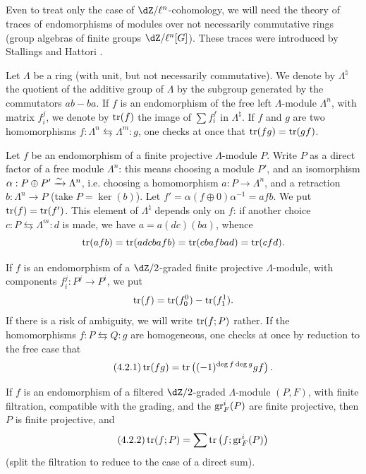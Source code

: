 \subsection{}\label{II:4-2}

Even to treat only the case of $\dZ/\ell^n$-cohomology, we will
need the theory of traces of endomorphisms of modules over
not necessarily commutative rings (group algebras of finite groups
$\dZ/\ell^n[G]$). These traces were introduced by Stallings and Hattori
\cite{ba76}.

Let $\Lambda$ be a ring (with unit, but not necessarily commutative).
We denote by $\Lambda^\natural$ the quotient of the additive group of $\Lambda$ by the
subgroup generated by the commutators $a b - b a$. If $f$ is an
endomorphism of the free left $\Lambda$-module $\Lambda^n$, with matrix
$f_i^j$, we denote by $\operatorname{tr}(f)$ the image of $\sum f_i^f$ in $\Lambda^\natural$.
If $f$ and $g$ are two homomorphisms
$f:\Lambda^n \leftrightarrows \Lambda^m : g$, one checks at once that
$\operatorname{tr}(f g) = \operatorname{tr}(g f)$.

Let $f$ be an endomorphism of a finite projective $\Lambda$-module $P$.
Write $P$ as a direct factor of a free module $\Lambda^n$: this means
choosing a module $P'$, and an isomorphism $\alpha:P\oplus P'\xrightarrow\sim \Lambda^n$,
i.e. choosing a homomorphism $a:P\to \Lambda^n$, and a retraction
$b:\Lambda^n\to P$ (take $P=\ker(b)$). Let
$f'=\alpha(f\oplus 0)\alpha^{-1} =af b$. We put $\operatorname{tr}(f) = \operatorname{tr}(f')$. This
element of $\Lambda^\natural$ depends only on $f$: if another choice
$c:P\leftrightarrows \Lambda^m:d$ is made, we have $a=a(dc)(ba)$, whence
\[
 \operatorname{tr}(a f b) = \operatorname{tr}(adcbafb) = \operatorname{tr}(cbafbad) = \operatorname{tr}(cfd) \text{.}
\]

If $f$ is an endomorphism of a $\dZ/2$-graded finite projective $\Lambda$-module,
with components $f_i^j:P^j\to P^i$, we put
\[
  \operatorname{tr}(f) = \operatorname{tr}(f_0^0) - \operatorname{tr}(f_1^1) \text{.}
\]
If there is a risk of ambiguity, we will write $\operatorname{tr}(f;P)$ rather. If the
homomorphisms $f:P\leftrightarrows Q:g$ are homogeneous, one checks
at once by reduction to the free case that
\begin{equation*}\tag{4.2.1}\label{II:eq:4-2-1}
  \operatorname{tr}(f g) = \operatorname{tr}\left((-1)^{\deg f \deg g} g f\right) \text{.}
\end{equation*}

If $f$ is an endomorphism of a filtered $\dZ/2$-graded $\Lambda$-module
$(P,F)$, with finite filtration, compatible with the grading, and the
$\operatorname{gr}_F^i(P)$ are finite projective, then $P$ is finite projective,
and
\begin{equation*}\tag{4.2.2}\label{II:eq:4-2-2}
  \operatorname{tr}(f;P) = \sum \operatorname{tr}\left(f; \operatorname{gr}_F^i(P) \right)
\end{equation*}
(split the filtration to reduce to the case of a direct sum).





